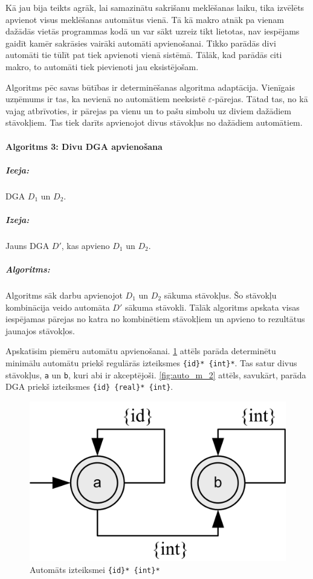 Kā jau bija teikts agrāk, lai samazinātu sakrišanu meklēšanas laiku, tika izvēlēts apvienot visus meklēšanas automātus vienā. Tā kā makro atnāk pa vienam dažādās vietās programmas kodā un var sākt uzreiz tikt lietotas, nav iespējams gaidīt kamēr sakrāsies vairāki automāti apvienošanai. Tikko parādās divi automāti tie tūlīt pat tiek apvienoti vienā sistēmā. Tālāk, kad parādās citi makro, to automāti tiek pievienoti jau eksistējošam.

Algoritms pēc savas būtības ir determinēšanas algoritma adaptācija. Vienīgais uzņēmums ir tas, ka nevienā no automātiem neeksistē $\varepsilon$-pārejas. Tātad tas, no kā vajag atbrīvoties, ir pārejas pa vienu un to pašu simbolu uz diviem dažādiem stāvokļiem. Tas tiek darīts apvienojot divus stāvokļus no dažādiem automātiem. 

\paragraph*{Algoritms 3: Divu DGA apvienošana}
\subparagraph{Ieeja:}DGA $D_1$ un $D_2$.
\subparagraph{Izeja:}Jauns DGA $D'$, kas apvieno $D_1$ un $D_2$.
\subparagraph{Algoritms:} 

Algoritms sāk darbu apvienojot $D_1$ un $D_2$ sākuma stāvokļus. Šo stāvokļu kombinācija veido automāta $D'$ sākuma stāvokli. Tālāk algoritms apskata visas iespējamas pārejas no katra no kombinētiem stāvokļiem un apvieno to rezultātus jaunajos stāvokļos. 

Apskatīsim piemēru automātu apvienošanai. \ref{fig:auto_m_1} attēls parāda determinētu minimālu automātu priekš regulārās izteiksmes \verb|{id}* {int}*|. Tas satur divus stāvokļus, \verb|a| un \verb|b|, kuri abi ir akceptējoši. \ref{fig:auto_m_2} attēls, savukārt, parāda DGA priekš izteiksmes \verb|{id} {real}* {int}|.

\begin{figure}[H]
  \centering
    \includegraphics[scale=1.5]{pictures/auto_m_1}
  \caption{\label{fig:auto_m_1}Automāts izteiksmei \texttt{\{id\}* \{int\}*}}
\end{figure}

